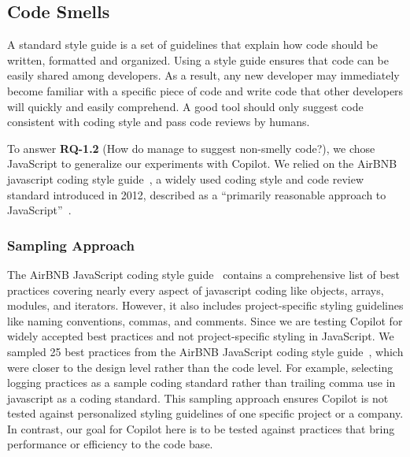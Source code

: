 \subsection{Code Smells}
\label{smells}
A standard style guide is a set of guidelines that explain how code should be written, formatted and organized. 
Using a style guide ensures that code can be easily shared among developers. As a result, any new developer may immediately become familiar with a specific piece of code and write code that other developers will quickly and easily comprehend.
A good \cct{} tool should only suggest code consistent with coding style and pass code reviews by humans. 

To answer \textbf{RQ-1.2} (How do \cct{} manage to suggest non-smelly code?), we chose JavaScript to generalize our experiments with Copilot. 
We relied on the AirBNB javascript coding style guide~\cite{airbnb_code}, a widely used coding style and code review standard introduced in 2012, described as a ``primarily reasonable approach to JavaScript''~\cite{airbnb_code}.


\subsubsection{Sampling Approach}
\label{smells:sampling}
The AirBNB JavaScript coding style guide~\cite{airbnb_code} contains a comprehensive list of best practices covering nearly every aspect of javascript coding like objects, arrays, modules, and iterators. However, it also includes project-specific styling guidelines like naming conventions, commas, and comments.
Since we are testing Copilot for widely accepted best practices and not project-specific styling in JavaScript. 
We sampled 25 best practices from the AirBNB JavaScript coding style guide~\cite{airbnb_code}, 
which were closer to the design level rather than the code level. For example, selecting logging practices as a sample coding standard rather than trailing comma use in javascript as a coding standard. 
This sampling approach ensures Copilot is not tested against personalized styling guidelines of one specific project or a company. In contrast, our goal for Copilot here is to be tested against practices that bring performance or efficiency to the code base.

